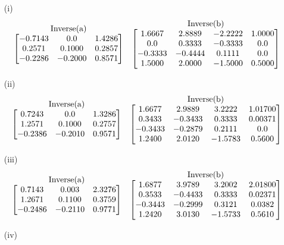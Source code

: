 \documentclass[12pt]{report}
\begin{document}
\begin{itemize}
\item[(i)] \[
\stackrel{\mbox{Inverse(a)}}{%
\begin{bmatrix}
{-0.7143} & {0.0} & {1.4286} \\
{0.2571} & {0.1000} & {0.2857} \\
{-0.2286} & {-0.2000} & {0.8571} 
\end{bmatrix}%
}
\quad
\stackrel{\mbox{Inverse(b)}}{%
\begin{bmatrix}
{1.6667} & {2.8889} & {-2.2222} & {1.0000} \\
{0.0} & {0.3333} & {-0.3333} & {0.0} \\
{-0.3333} & {-0.4444} & {0.1111} & {0.0} \\
{1.5000} & {2.0000} & {-1.5000} & {0.5000} 
\end{bmatrix}%
}
\]
\item[(ii)] \[
\stackrel{\mbox{Inverse(a)}}{%
\begin{bmatrix}
{0.7243} & {0.0} & {1.3286} \\
{1.2571} & {0.1000} & {0.2757} \\
{-0.2386} & {-0.2010} & {0.9571} 
\end{bmatrix}%
}
\quad
\stackrel{\mbox{Inverse(b)}}{%
\begin{bmatrix}
{1.6677} & {2.9889} & {3.2222} & {1.01700} \\
{0.3433} & {-0.3433} & {0.3333} & {0.00371} \\
{-0.3433} & {-0.2879} & {0.2111} & {0.0} \\
{1.2400} & {2.0120} & {-1.5783} & {0.5600} 
\end{bmatrix}%
}
\]
\item[(iii)] \[
\stackrel{\mbox{Inverse(a)}}{%
\begin{bmatrix}
{0.7143} & {0.003} & {2.3276} \\
{1.2671} & {0.1100} & {0.3759} \\
{-0.2486} & {-0.2110} & {0.9771} 
\end{bmatrix}%
}
\quad
\stackrel{\mbox{Inverse(b)}}{%
\begin{bmatrix}
{1.6877} & {3.9789} & {3.2002} & {2.01800} \\
{0.3533} & {-0.4433} & {0.3333} & {0.02371} \\
{-0.3443} & {-0.2999} & {0.3121} & {0.0382} \\
{1.2420} & {3.0130} & {-1.5733} & {0.5610} 
\end{bmatrix}%
}
\]
\item[(iv)] \[
\]
\end{itemize}
\end{document}
